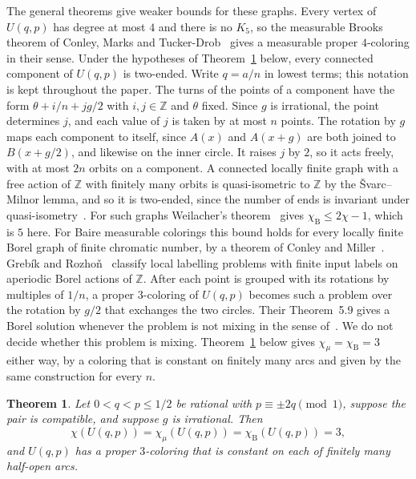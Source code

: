 \documentclass[11pt]{amsart}
\newtheorem{theorem}{Theorem}[section]
\theoremstyle{remark}
\numberwithin{equation}{section}
\newcommand{\Z}{\mathbb{Z}}
\newcommand{\chiB}{\chi_{\mathrm B}}
\newcommand{\chiM}{\chi_{\mu}}
\begin{document}
The general theorems give weaker bounds for these graphs. Every vertex of $U(q,p)$ has degree at most $4$ and there is no
$K_5$, so the measurable Brooks theorem of Conley, Marks and
Tucker-Drob~\cite[Theorem~1.2]{CMT16} gives a measurable proper
$4$-coloring in their sense. Under the hypotheses of
Theorem~\ref{thm:main} below, every connected component of $U(q,p)$ is
two-ended. Write $q=a/n$ in lowest terms; this notation is kept throughout the paper. The turns of the points of a
component have the form $\theta+i/n+jg/2$ with $i,j\in\Z$ and $\theta$
fixed. Since $g$ is irrational, the point determines $j$, and each value
of $j$ is taken by at most $n$ points. The rotation by $g$ maps each
component to itself, since $A(x)$ and $A(x+g)$ are both joined to
$B(x+g/2)$, and likewise on the inner circle. It raises $j$ by $2$, so it
acts freely, with at most $2n$ orbits on a component. A connected locally
finite graph with a free action of $\Z$ with finitely many orbits is
quasi-isometric to $\Z$ by the \v{S}varc--Milnor lemma, and so it is
two-ended, since the number of ends is invariant under
quasi-isometry~\cite[Chapter~I.8]{BH99}. For such graphs Weilacher's
theorem~\cite[Theorem~1.3]{Wei20} gives $\chiB\le2\chi-1$, which is $5$
here. For Baire measurable colorings this bound holds for every locally
finite Borel graph of finite chromatic number, by a theorem of Conley and
Miller~\cite[Theorem~B]{CM16}. Greb\'ik and
Rozho\v{n}~\cite{GR21} classify local labelling problems with finite
input labels on aperiodic Borel actions of $\Z$. After each point is
grouped with its rotations by multiples of $1/n$, a proper $3$-coloring
of $U(q,p)$ becomes such a problem over the rotation by $g/2$ that
exchanges the two circles. Their Theorem~5.9 gives a Borel solution
whenever the problem is not mixing in the sense
of~\cite[Definition~5.8]{GR21}. We do not decide whether this problem is
mixing. Theorem~\ref{thm:main} below gives $\chiM=\chiB=3$ either way,
by a coloring that is constant on finitely many arcs and given by the
same construction for every $n$.

\begin{theorem}\label{thm:main}
Let $0<q<p\le1/2$ be rational with $p\equiv\pm2q\pmod1$, suppose the
pair is compatible, and suppose $g$ is irrational. Then
\[
\chi(U(q,p))=\chiM(U(q,p))=\chiB(U(q,p))=3,
\]
and $U(q,p)$ has a proper $3$-coloring that is constant on each of
finitely many half-open arcs.
\end{theorem}
\end{document}
